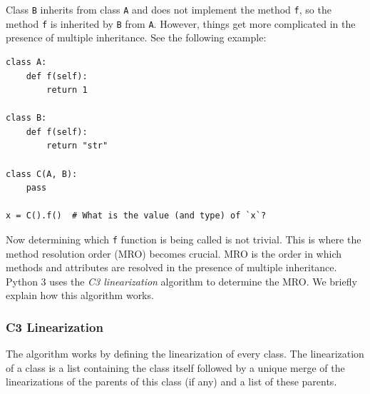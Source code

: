 Class \lstinline|B| inherits from class \lstinline|A| and does not implement the method \lstinline|f|, so the method \lstinline|f| is inherited by \lstinline|B| from \lstinline|A|. However, things get more complicated in the presence of multiple inheritance. See the following example:

\begin{lstlisting}
class A:
	def f(self):
		return 1

class B:
	def f(self):
		return "str"
		
class C(A, B):
	pass
	
x = C().f()  # What is the value (and type) of `x`?
\end{lstlisting}

Now determining which \lstinline|f| function is being called is not trivial. This is where the method resolution order (MRO) becomes crucial. MRO is the order in which methods and attributes are resolved in the presence of multiple inheritance. Python 3 uses the \textit{C3 linearization} algorithm to determine the MRO. We briefly explain how this algorithm works.

\subsubsection{C3 Linearization}
The algorithm works by defining the linearization of every class. The linearization of a class is a list containing the class itself followed by a unique merge of the linearizations of the parents of this class (if any) and a list of these parents.

